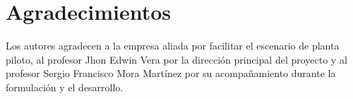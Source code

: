 \chapter*{Agradecimientos}

Los autores agradecen a la empresa aliada por facilitar el escenario de planta piloto, al profesor Jhon Edwin Vera por la dirección principal del proyecto y al profesor Sergio Francisco Mora Martínez por su acompañamiento durante la formulación y el desarrollo.
\clearpage
